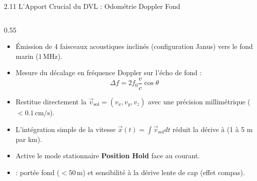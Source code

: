 \begin{frame}{2.11 L'Apport Crucial du DVL : Odométrie Doppler Fond}
  \begin{columns}[c]
    \begin{column}{0.55\textwidth}
      \begin{block}{}
        \scriptsize
        \begin{itemize}
          \item Émission de 4 faisceaux acoustiques inclinés (configuration Janus) vers le fond marin ($1\,\text{MHz}$).
          \item Mesure du décalage en fréquence Doppler sur l'écho de fond :
          \[
            \Delta f = 2 f_0 \frac{v}{c} \cos\theta
          \]
          \item Restitue directement la  $\vec{v}_{\text{sol}} = (v_x, v_y, v_z)$ avec une précision millimétrique ($<0.1\,\text{cm/s}$).
        \end{itemize}
      \end{block}

      \begin{block}{}
        \scriptsize
        \begin{itemize}
          \item L'intégration simple de la vitesse $\vec{x}(t) = \int \vec{v}_{\text{sol}} dt$ réduit la dérive à  (1 à 5 m par km).
          \item Active le mode stationnaire \textbf{Position Hold} face au courant.
          \item {} : portée fond ($<50\,\text{m}$) et sensibilité à la dérive lente de cap (effet compas).
        \end{itemize}
      \end{block}
    \end{column}


\end{columns}
\end{frame}
